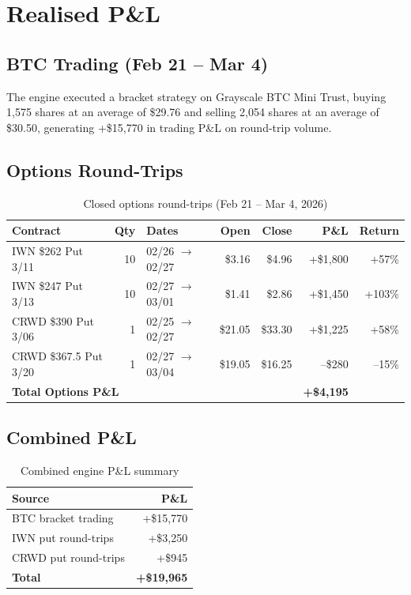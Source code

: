 \documentclass[11pt,letterpaper]{article}
\begin{document}
\section{Realised P\&L}

\subsection{BTC Trading (Feb 21 -- Mar 4)}

The engine executed a bracket strategy on Grayscale BTC Mini Trust,
buying 1,575 shares at an average of \$29.76 and selling 2,054 shares
at an average of \$30.50, generating \textcolor{gain}{+\$15,770} in
trading P\&L on round-trip volume.

\subsection{Options Round-Trips}

\begin{table}[H]
\centering
\caption{Closed options round-trips (Feb 21 -- Mar 4, 2026)}
{\small
\begin{tabular*}{\textwidth}{@{\extracolsep{\fill}}l r l r r r r}
\toprule
Contract & Qty & Dates & Open & Close & P\&L & Return \\
\midrule
IWN \$262 Put 3/11 & 10 & 02/26 $\to$ 02/27 & \$3.16 & \$4.96 & \textcolor{gain}{+\$1,800} & +57\% \\
IWN \$247 Put 3/13 & 10 & 02/27 $\to$ 03/01 & \$1.41 & \$2.86 & \textcolor{gain}{+\$1,450} & +103\% \\
CRWD \$390 Put 3/06 & 1 & 02/25 $\to$ 02/27 & \$21.05 & \$33.30 & \textcolor{gain}{+\$1,225} & +58\% \\
CRWD \$367.5 Put 3/20 & 1 & 02/27 $\to$ 03/04 & \$19.05 & \$16.25 & \textcolor{loss}{--\$280} & --15\% \\
\midrule
\multicolumn{5}{l}{\textbf{Total Options P\&L}} & \textcolor{gain}{\textbf{+\$4,195}} & \\
\bottomrule
\end{tabular*}}
\end{table}

\subsection{Combined P\&L}

\begin{table}[H]
\centering
\caption{Combined engine P\&L summary}
\begin{tabular}{lr}
\toprule
Source & P\&L \\
\midrule
BTC bracket trading     & \textcolor{gain}{+\$15,770} \\
IWN put round-trips     & \textcolor{gain}{+\$3,250} \\
CRWD put round-trips    & \textcolor{gain}{+\$945} \\
\midrule
\textbf{Total}        & \textcolor{gain}{\textbf{+\$19,965}} \\
\bottomrule
\end{tabular}
\end{table}
\end{document}
